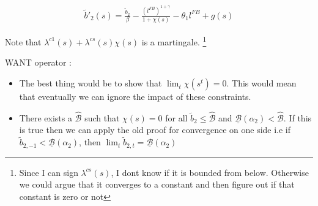 \documentclass[thmsb,11pt]{article}
\begin{document}
\begin{align}
\tilde{b}'_2(s)=\frac{\tilde{b}_2}{\beta}-\frac{(l^{FB})^{1+\gamma}}{1+\chi(s)}-\theta_1l^{FB}+g(s)
\end{align}

Note that $\lambda^{c1}(s)+\lambda^{cs}(s)\chi(s)$ is a martingale. \footnote{Since I can sign $\lambda^{cs}(s)$, I dont know if it is bounded from below. Otherwise we could argue that it converges to a constant and then figure out if that constant is zero or not}



WANT operator :

\begin{itemize}
 \item The best thing would be to show that $\lim_t \chi(s^t)=0$. This would mean that eventually we can ignore the impact of these constraints.
 \item There exists a $\hat{\mathcal{B}}$ such that $\chi(s)=0$ for all $\tilde{b}_{2}\leq\hat{\mathcal{B}}$ and $\underline{\mathcal{B}}(\alpha_2)<\hat{\mathcal{B}}$. If this is true then we can apply the old proof for convergence on one side i.e if $\tilde{b}_{2,-1}<\underline{\mathcal{B}}(\alpha_2)$, then $\lim_t\tilde{b}_{2,t}=\underline{\mathcal{B}}(\alpha_2)$
\end{itemize}
\end{document}
